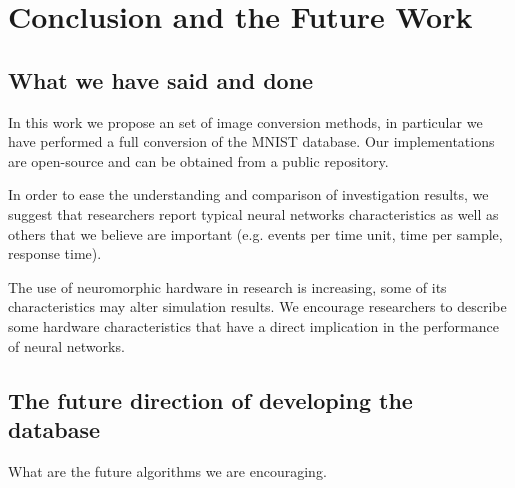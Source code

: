 \section{Conclusion and the Future Work}
\label{sec:summ}
\subsection{What we have said and done}
In this work we propose an set of image conversion methods, in particular we have performed a full conversion of the MNIST database. Our implementations are open-source and can be obtained from a public repository.

In order to ease the understanding and comparison of investigation results, we suggest that researchers report typical neural networks characteristics as well as others that we believe are important (e.g. events per time unit, time per sample, response time).

The use of neuromorphic hardware in research is increasing, some of its characteristics may alter simulation results. We encourage researchers to describe some hardware characteristics that have a direct implication in the performance of neural networks.

\subsection{The future direction of developing the database}
What are the future algorithms we are encouraging.


